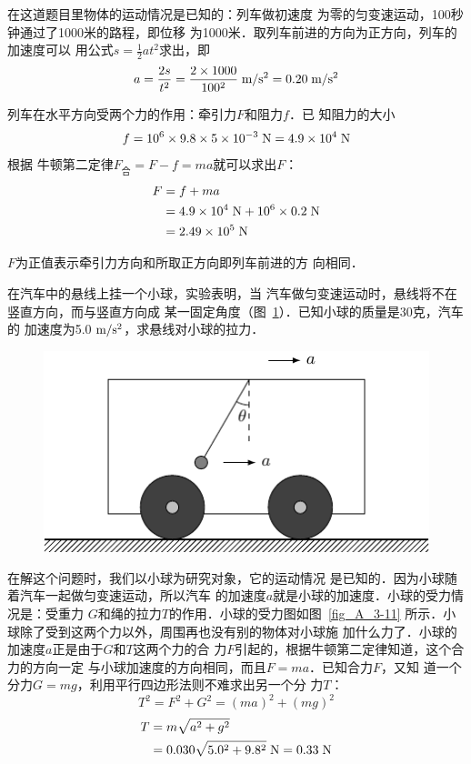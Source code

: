 \begin{solution}
在这道题目里物体的运动情况是已知的：列车做初速度
为零的匀变速运动，100秒钟通过了1000米的路程，即位移
为1000米．取列车前进的方向为正方向，列车的加速度可以
用公式$s=\frac{1}{2}at^2$求出，即
\[a=\frac{2s}{t^2}=\frac{2\times 1000}{100^2}\;\text{m}/\text{s}^2=0.20\;\text{m}/\text{s}^2 \]

    列车在水平方向受两个力的作用：牵引力$F$和阻力$f$．已
知阻力的大小
\[f=10^6\times 9.8\times 5\times 10^{-3} \;\text{N}=4.9\times 10^4 \;\text{N} \]
根据
牛顿第二定律$F_{\text{合}}=F-f=ma$就可以求出$F$：
\[\begin{split}
F&=f+ma\\
&=4.9\times 10^4 \;\text{N}+10^6\times 0.2 \;\text{N}\\
&=2.49\times 10^5\;\text{N}
\end{split} \]

$F$为正值表示牵引力方向和所取正方向即列车前进的方
向相同．
\end{solution}


\begin{example}
在汽车中的悬线上挂一个小球，实验表明，当
汽车做匀变速运动时，悬线将不在竖直方向，而与竖直方向成
某一固定角度（图~\ref{fig_A_3-10}）．已知小球的质量是30克，汽车的
加速度为5.0$\;\text{m}/\text{s}^2$，求悬线对小球的拉力．
\begin{figure}[htbp]
	\centering
	\includegraphics{fig/A/3-10.pdf}
	\caption{}\label{fig_A_3-10}
\end{figure}
\end{example}



\begin{solution}
    在解这个问题时，我们以小球为研究对象，它的运动情况
是已知的．因为小球随着汽车一起做匀变速运动，所以汽车
的加速度$a$就是小球的加速度．小球的受力情况是：受重力
$G$和绳的拉力$T$的作用．小球的受力图如图~\ref{fig_A_3-11} 所示．小
球除了受到这两个力以外，周围再也没有别的物体对小球施
加什么力了．小球的加速度$a$正是由于$G$和$T$这两个力的合
力$F$引起的，根据牛顿第二定律知道，这个合力的方向一定
与小球加速度的方向相同，而且$F=ma$．已知合力$F$，又知
道一个分力$G=mg$，利用平行四边形法则不难求出另一个分
力$T$：
\[T^2=F^2+G^2=(ma)^2+(mg)^2 \]
\[\begin{split}
T&=m\sqrt{a^2+g^2}\\
&=0.030\sqrt{5.0^2+9.8^2} \;\text{N}=0.33 \;\text{N}
\end{split} \]
\end{solution}

